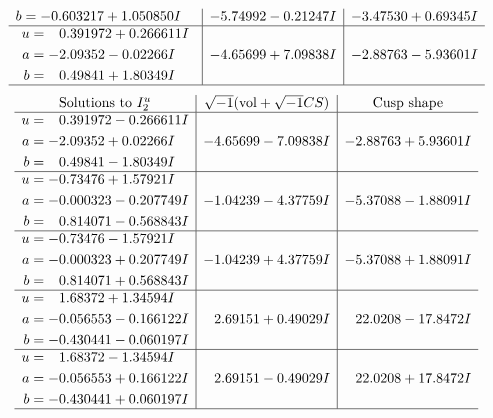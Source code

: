 \documentclass[1p]{elsarticle_modified}
\theoremstyle{definition}
\newcommand{\I}{\sqrt{-1}}
\begin{document}
$$\begin{array}{c|c|c}
\begin{aligned}
b &= -0.603217 + 1.050850 I\end{aligned}
 & -5.74992 - 0.21247 I & -3.47530 + 0.69345 I \\ \hline\begin{aligned}
u &= \phantom{-}0.391972 + 0.266611 I \\
a &= -2.09352 - 0.02266 I \\
b &= \phantom{-}0.49841 + 1.80349 I\end{aligned}
 & -4.65699 + 7.09838 I & -2.88763 - 5.93601 I\\
 \hline 
 \end{array}$$\newpage$$\begin{array}{c|c|c}  
\text{Solutions to }I^u_{2}& \I (\text{vol} + \sqrt{-1}CS) & \text{Cusp shape}\\
 \hline 
\begin{aligned}
u &= \phantom{-}0.391972 - 0.266611 I \\
a &= -2.09352 + 0.02266 I \\
b &= \phantom{-}0.49841 - 1.80349 I\end{aligned}
 & -4.65699 - 7.09838 I & -2.88763 + 5.93601 I \\ \hline\begin{aligned}
u &= -0.73476 + 1.57921 I \\
a &= -0.000323 - 0.207749 I \\
b &= \phantom{-}0.814071 - 0.568843 I\end{aligned}
 & -1.04239 - 4.37759 I & -5.37088 - 1.88091 I \\ \hline\begin{aligned}
u &= -0.73476 - 1.57921 I \\
a &= -0.000323 + 0.207749 I \\
b &= \phantom{-}0.814071 + 0.568843 I\end{aligned}
 & -1.04239 + 4.37759 I & -5.37088 + 1.88091 I \\ \hline\begin{aligned}
u &= \phantom{-}1.68372 + 1.34594 I \\
a &= -0.056553 - 0.166122 I \\
b &= -0.430441 - 0.060197 I\end{aligned}
 & \phantom{-}2.69151 + 0.49029 I & \phantom{-}22.0208 - 17.8472 I \\ \hline\begin{aligned}
u &= \phantom{-}1.68372 - 1.34594 I \\
a &= -0.056553 + 0.166122 I \\
b &= -0.430441 + 0.060197 I\end{aligned}
 & \phantom{-}2.69151 - 0.49029 I & \phantom{-}22.0208 + 17.8472 I\\
 \hline 
 \end{array}$$\newpage
\end{document}
